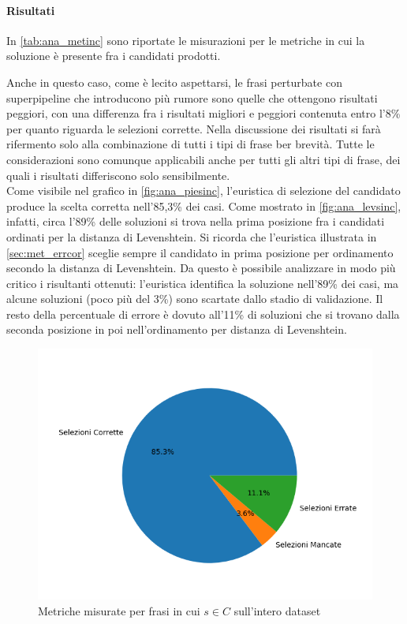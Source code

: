 \paragraph{Risultati}
In \autoref{tab:ana_metinc} sono riportate le misurazioni per le metriche in cui la soluzione è presente fra i candidati prodotti.


Anche in questo caso, come è lecito aspettarsi, le frasi perturbate con superpipeline che introducono più rumore sono quelle che ottengono risultati peggiori, con una differenza fra i risultati migliori e peggiori contenuta entro l'8\% per quanto riguarda le selezioni corrette.
Nella discussione dei risultati si farà rifermento solo alla combinazione di tutti i tipi di frase ber brevità. Tutte le considerazioni sono comunque applicabili anche per tutti gli altri tipi di frase, dei quali i risultati differiscono solo sensibilmente.\\
Come visibile nel grafico in \autoref{fig:ana_piesinc}, l'euristica di selezione del candidato produce la scelta corretta nell'85,3\% dei casi. Come mostrato in \autoref{fig:ana_levsinc}, infatti, circa l'89\% delle soluzioni si trova nella prima posizione fra i candidati ordinati per la distanza di Levenshtein. Si ricorda che l'euristica illustrata in \autoref{sec:met_errcor} sceglie sempre il candidato in prima posizione per ordinamento secondo la distanza di Levenshtein. Da questo è possibile analizzare in modo più critico i risultanti ottenuti: l'euristica identifica la soluzione nell'89\% dei casi, ma alcune soluzioni (poco più del 3\%) sono scartate dallo stadio di validazione. Il resto della percentuale di errore è dovuto all'11\% di soluzioni che si trovano dalla seconda posizione in poi nell'ordinamento per distanza di Levenshtein.


\begin{figure}[H]
\centering
\includegraphics[width=\textwidth]{immagini/analisi/correct_combinato}
\caption{Metriche misurate per frasi in cui $s \in C$ sull'intero dataset}
\label{fig:ana_piesinc}
\end{figure}



